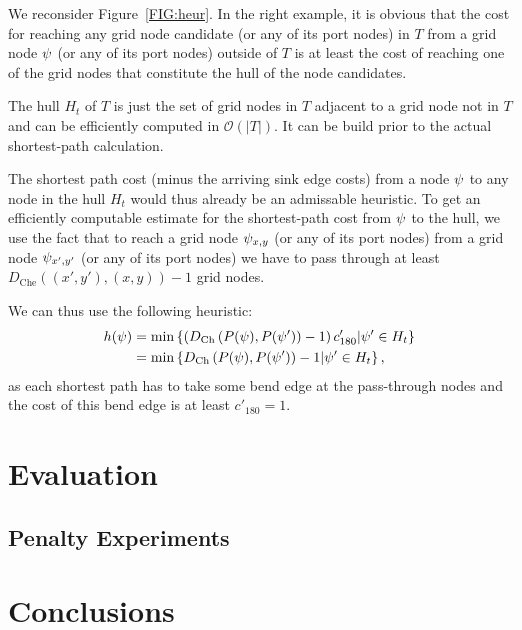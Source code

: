 \documentclass[sigconf]{acmart}
\begin{document}
We reconsider Figure~\ref{FIG:heur}.
In the right example, it is obvious that the cost for reaching any grid node candidate (or any of its port nodes) in $T$ from a grid node $\psi$ (or any of its port nodes) outside of $T$ is at least the cost of reaching one of the grid nodes that constitute the hull of the node candidates.

The hull $H_t$ of $T$ is just the set of grid nodes in $T$ adjacent to a grid node not in $T$ and can be efficiently computed in $\mathcal{O}(|T|)$.
It can be build prior to the actual shortest-path calculation.

The shortest path cost (minus the arriving sink edge costs) from a node $\psi$ to any node in the hull $H_t$ would thus already be an admissable heuristic.
To get an efficiently computable estimate for the shortest-path cost from $\psi$ to the hull, we use the fact that to reach a grid node $\psi_{x, y}$ (or any of its port nodes) from a grid node $\psi_{x', y'}$ (or any of its port nodes) we have to pass through at least $D_{\text{Che}}((x', y'), (x, y)) - 1$ grid nodes.

We can thus use the following heuristic:
%
\begin{align}
	h(\psi) &= \min\left\{ \left(D_{\text{Ch}}\left(P(\psi), P(\psi') \right) - 1\right) c'_{180}| \psi' \in H_t \right\}\\
	&= \min\left\{ D_{\text{Ch}}\left(P(\psi), P(\psi') \right) - 1 | \psi' \in H_t \right\},
\end{align}
%
as each shortest path has to take some bend edge at the pass-through nodes and the cost of this bend edge is at least $c'_{180} = 1$.

\section{Evaluation}

\subsection{Penalty Experiments}

\section{Conclusions}
\end{document}
